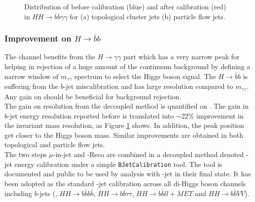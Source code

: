 \begin{figure}[htbp]
   \centering
   \quad
   \begin{tcolorbox}[colback=black!5!white,colframe=white!75!black]
   \caption{Distribution of \mbb before calibration (blue) and after calibration (red) in $HH\rightarrow bb\gamma\gamma$ for (a) topological cluster jets (b) particle flow jets.}
   \label{fig:Jet:Cal:BCal:Result:mbb}
   \end{tcolorbox}
\end{figure}

\subsubsection{Improvement on $H\rightarrow\bar{b}b$}
The \HHyybb channel benefits from the $H\rightarrow\gamma\gamma$ part which has a very narrow peak for \myy helping in rejection of a huge amount of the continuum background by defining a narrow window of $m_{\gamma\gamma}$ spectrum to select the Higgs boson signal. The $H\rightarrow\bar{b}b$ is suffering from the $b$-jet miscalibration and has large \mbb resolution compared to $m_{\gamma\gamma}$. Any gain on \mbb should be beneficial for background rejection.\\
The gain on \mbb resolution from the decoupled method is quantified on \HHyybb. The gain in $b$-jet energy resolution reported before is translated into $\sim$22\% improvement in the \mbb invariant mass resolution, as Figure \ref{fig:Jet:Cal:BCal:Result:mbb} shows. In addition, the \mbb peak position get closer to the Higgs boson mass. Similar improvements are obtained in both topological and particle flow jets.\\
The two steps $\mu$-in-jet and \pT-Reco are combined in a decoupled method denoted \bq-jet energy calibration under a simple \texttt{BJetCalibration} tool. The tool is documented and public to be used by analysis with \bq-jet in their final state. It has been adopted as the standard \bq-jet calibration across all di-Higgs boson channels including $b$-jets (\HHyybb, $HH\rightarrow b\bar{b}b\bar{b}$, $HH\rightarrow b\bar{b}\tau\tau$,  $HH\rightarrow b\bar{b}ll+MET$ and $HH\rightarrow b\bar{b}VV$).

